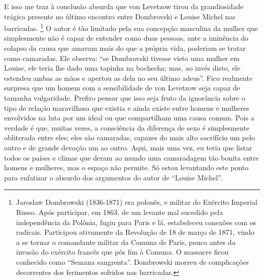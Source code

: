E isso me traz à conclusão absurda que von Levetzow tirou da
grandiosidade trágica presente no último encontro entre Dombrovski e
Louise Michel nas barricadas. \footnote{Jaroslaw Dombrowski (1836-1871)
  era polonês, e militar do Exército Imperial Russo. Após participar, em
  1863, de um levante mal sucedido pela independência da Polônia, fugiu
  para Paris e lá, estabeleceu conexões com os radicais. Participou
  ativamente da Revolução de 18 de março de 1871, vindo a se tornar o
  comandante militar da Comuna de Paris, pouco antes da invasão do
  exército francês que pôs fim à Comuna. O massacre ficou conhecido como
  ``Semana sangrenta''. Dombrowski morreu de complicações decorrentes
  dos ferimentos sofridos nas barricadas.} O autor é tão limitado pela
sua concepção masculina da mulher que simplesmente não é capaz de
entender como duas pessoas, ante a iminência do colapso da causa que
amavam mais do que a própria vida, poderiam se tratar como camaradas.
Ele observa: ``se Dombrovski tivesse visto uma mulher em Louise, ele
teria lhe dado uma tapinha na bochecha; mas, ao invés disto, ele
estendeu ambas as mãos e apertou as dela no seu último adeus''. Fico
realmente surpresa que um homem com a sensibilidade de von Levetzow seja
capaz de tamanha vulgaridade. Prefiro pensar que isso seja fruto da
ignorância sobre o tipo de relação maravilhosa que existia e ainda
existe entre homens e mulheres envolvidos na luta por um ideal ou que
compartilham uma causa comum. Pois a verdade é que, muitas vezes, a
consciência da diferença de sexo é simplesmente obliterada entre eles;
eles são camaradas, capazes do mais alto sacrifício um pelo outro e de
grande devoção um ao outro. Aqui, mais uma vez, eu teria que listar
todos os países e climas que deram ao mundo uma camaradagem tão bonita
entre homens e mulheres, mas o espaço não permite. Só estou levantando
este ponto para enfatizar o absurdo dos argumentos do autor de ``Louise
Michel''.

